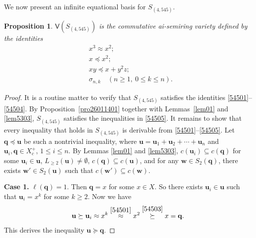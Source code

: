 \documentclass[reqno]{amsart}
\theoremstyle{plain}
\newtheorem{pro}[thm]{Proposition}
\theoremstyle{definition}
\newcommand{\bq}{\mathbf{q}}
\newcommand{\bu}{\mathbf{u}}
\newcommand{\bw}{\mathbf{w}}
\begin{document}
We now present an infinite equational basis for $S_{(4, 545)}$.
\begin{pro}\label{pro54501}
$\mathsf{V}(S_{(4, 545)})$ is the commutative ai-semiring variety defined by the identities
\begin{align}
&x^3 \approx x^2; \label{54501}\\
&x \preceq  x^2; \label{54503}\\
&xy \preceq x+y^2z;\label{54504}\\
&\sigma_{n,k} \quad (n \geq 1, ~0\leq k\leq n).\label{54505}
\end{align}
\end{pro}
\begin{proof}
It is a routine matter to verify that $S_{(4, 545)}$ satisfies the identities \eqref{54501}--\eqref{54504}.
By Proposition~\ref{pro26011401} together with Lemmas~\ref{lem01} and \ref{lem5303},
$S_{(4, 545)}$ satisfies the inequalities in \eqref{54505}.
It remains to show that every inequality that holds in $S_{(4, 545)}$
is derivable from \eqref{54501}--\eqref{54505}.
Let $\bq\preceq \bu$ be such a nontrivial inequality, where
$\bu=\bu_1+\bu_2+\cdots+\bu_n$ and $\bu_i, \bq \in X_c^+$, $1 \leq i \leq n$.
By Lemmas \ref{lem01} and \ref{lem5303},
$c(\bu_i)\subseteq c(\bq)$ for some $\bu_i\in\bu$,
$L_{\geq 2}(\bu)\neq \emptyset$, $c(\bq)\subseteq c(\bu)$,
and for any $\bw\in S_2(\bq)$, there exists $\bw'\in S_2(\bu)$ such that $c(\bw')\subseteq c(\bw)$.

\textbf{Case 1.} $\ell(\bq)=1$. Then $\bq=x$ for some $x\in X$. So there exists $\bu_i\in \bu$ such that $\bu_i=x^k$ for some $k\geq2$.
Now we have
\[
\bu \succeq \bu_i\approx x^k\stackrel{\eqref{54501}}\approx x^2\stackrel{\eqref{54503}}\succeq x=\bq.
\]
This derives the inequality $\bu \succeq \bq$.


\end{proof}
\end{document}
